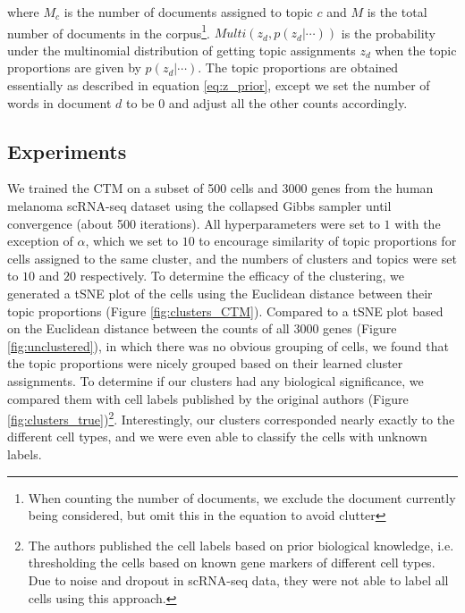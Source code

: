 \documentclass{article}
\begin{document}
where $M_{c}$ is the number of documents assigned to topic $c$ and $M$ is the total number of documents in the corpus\footnote{When counting the number of documents, we exclude the document currently being considered, but omit this in the equation to avoid clutter}. $Multi(z_d, p(z_{d}| \cdots))$ is the probability under the multinomial distribution of getting topic assignments $z_d$ when the topic proportions are given by $p(z_{d}| \cdots)$. The topic proportions are obtained essentially as described in equation \ref{eq:z_prior}, except we set the number of words in document $d$ to be $0$ and adjust all the other counts accordingly.

\subsection{Experiments}

We trained the CTM on a subset of 500 cells and 3000 genes from the human melanoma scRNA-seq dataset using the collapsed Gibbs sampler until convergence (about 500 iterations). All hyperparameters were set to $1$ with the exception of $\alpha$, which we set to $10$ to encourage similarity of topic proportions for cells assigned to the same cluster, and the numbers of clusters and topics were set to $10$ and $20$ respectively. To determine the efficacy of the clustering, we generated a tSNE plot of the cells using the Euclidean distance between their topic proportions (Figure \ref{fig:clusters_CTM}). Compared to a tSNE plot based on the Euclidean distance between the counts of all 3000 genes (Figure \ref{fig:unclustered}), in which there was no obvious grouping of cells, we found that the topic proportions were nicely grouped based on their learned cluster assignments. To determine if our clusters had any biological significance, we compared them with cell labels published by the original authors (Figure \ref{fig:clusters_true})\footnote{The authors published the cell labels based on prior biological knowledge, i.e. thresholding the cells based on known gene markers of different cell types. Due to noise and dropout in scRNA-seq data, they were not able to label all cells using this approach.}. Interestingly, our clusters corresponded nearly exactly to the different cell types, and we were even able to classify the cells with unknown labels. \\
\end{document}
